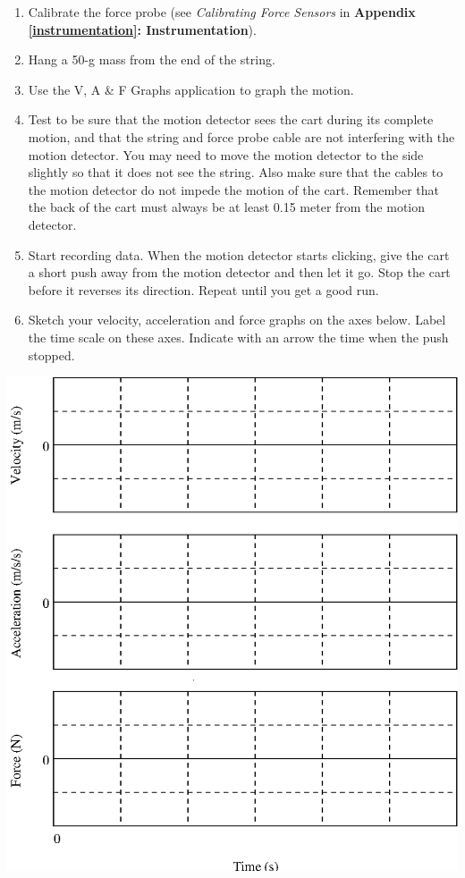 \begin{enumerate}
\item Calibrate the force probe (see \textit{Calibrating Force Sensors} in \textbf{Appendix \ref{instrumentation}: Instrumentation}).
\item Hang a 50-g mass from the end of the string.
\item Use the V, A \& F Graphs application to graph the motion. 
\item Test to be sure that the motion detector sees the cart during its complete motion,
and that the string and force probe cable are not interfering with the motion
detector. You may need to move the motion detector to the side slightly so that
it does not see the string. Also make sure that the cables to the motion detector
do not impede the motion of the cart. Remember that the back of the cart must
always be at least 0.15 meter from the motion detector. 
\item Start recording data. When the motion detector starts clicking, give the cart
a short push away from the motion detector and then let it go. Stop the cart
before it reverses its direction. Repeat until you get a good run. 
\item Sketch your velocity, acceleration and force graphs on the axes below. Label
the time scale on these axes. Indicate with an arrow the time when the push
stopped.
\end{enumerate}
\vspace{0.3cm}
{\par\centering \includegraphics{force2/force2_fig4.eps} \par}
\vspace{0.3cm}

